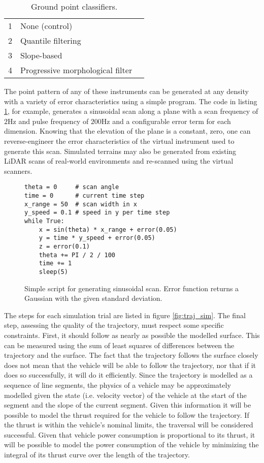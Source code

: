 \documentclass[10pt]{article}
\begin{document}
\begin{table}
\caption{Ground point classifiers.}
\label{table:class_methods}
\begin{tabular}{r | l | c}
\hline
1 & None (control) & \\
2 & Quantile filtering & \\
3 & Slope-based & \cite{Vosselman2000} \\
4 & Progressive morphological filter & \cite{Zhang2003} \\
\hline
\end{tabular}
\end{table}


The point pattern of any of these instruments can be generated at any density with a variety of error characteristics using a simple program. The code in listing \ref{fig:scan_code}, for example, generates a sinusoidal scan along a plane with a scan frequency of $2\si{\Hz}$ and pulse frequency of $200\si{\Hz}$ and a configurable error term for each dimension. Knowing that the elevation of the plane is a constant, zero, one can reverse-engineer the error characteristics of the virtual instrument used to generate this scan. Simulated terrains may also be generated from existing LiDAR scans of real-world environments and re-scanned using the virtual scanners. 

\begin{figure}
\begin{lstlisting}
theta = 0     # scan angle
time = 0      # current time step
x_range = 50  # scan width in x
y_speed = 0.1 # speed in y per time step
while True:
	x = sin(theta) * x_range + error(0.05)
	y = time * y_speed + error(0.05)
	z = error(0.1)
	theta += PI / 2 / 100
	time += 1
	sleep(5)
\end{lstlisting}
\caption{Simple script for generating sinusoidal scan. Error function returns a Gaussian with the given standard deviation.}
\label{fig:scan_code}
\end{figure}

The steps for each simulation trial are listed in figure \ref{fig:traj_sim}. The final step, assessing the quality of the trajectory, must respect some specific constraints. First, it should follow as nearly as possible the modelled surface. This can be measured using the sum of least squares of differences between the trajectory and the surface. The fact that the trajectory follows the surface closely does not mean that the vehicle will be able to follow the trajectory, nor that if it does so successfully, it will do it efficiently. Since the trajectory is modelled as a sequence of line segments, the physics of a vehicle may be approximately modelled given the state (i.e. velocity vector) of the vehicle at the start of the segment and the slope of the current segment. Given this information it will be possible to model the thrust required for the vehicle to follow the trajectory. If the thrust is within the vehicle's nominal limits, the traversal will be considered successful. Given that vehicle power consumption is proportional to its thrust, it will be possible to model the power consumption of the vehicle by minimizing the integral of its thrust curve over the length of the trajectory. 
\end{document}
